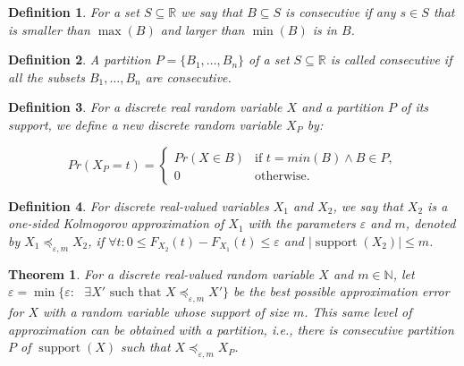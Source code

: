 \documentclass[review]{elsarticle}
\newtheorem{definition}{Definition}
\newtheorem{theorem}{Theorem}
\DeclareMathOperator{\supp}{support}
\DeclareMathOperator{\support}{support}
\begin{document}
\begin{definition}\label{consecutive} For a set $S \subseteq \mathbb{R}$ we say that
$B \subseteq S$ is \emph{consecutive} if any $s\in S$ that is smaller than $\max(B)$ and larger than $\min(B)$ is in $B$.
\end{definition}

\begin{definition}\label{part_consecutive} A partition $P=\{B_1,\dots,B_n\}$ of a set $S \subseteq \mathbb{R}$ is called 
\emph{consecutive} if all the subsets $B_1 ,\dots,B_n$ are consecutive.
\end{definition}


\begin{definition}\label{partition}
	For a discrete real random variable $X$ and a partition $P$ of its support, we define a new discrete random variable $X_P$ by:
	
	$$Pr(X_P = t) = \begin{cases} 
	Pr(X\in B) &  \text{if } t = min(B) \wedge  B \in P, \\
	0      & \text{otherwise.}
	\end{cases}$$
\end{definition}


\begin{definition}
	For discrete real-valued variables $X_1$ and $X_2$, we say that $X_2$ is a one-sided Kolmogorov approximation of $X_1$ with the parameters $\varepsilon$ and $m$, denoted by 
	$X_1 \preceq_{\varepsilon,m} X_2$, if $\forall t\colon 0 \leq   F_{X_2}(t)-F_{X_1}(t) \leq \varepsilon$ and $|\support(X_2)| \leq m$. 
\end{definition}

\begin{theorem}\label{approxAsPart}
	For a discrete real-valued random variable $X$ and $m \in \mathbb{N}$, 
	let $\varepsilon = \min\{\varepsilon \colon \text{  $\exists X'$ such that $X \preceq_{\varepsilon,m} X'$}\}$ be the best possible approximation error for $X$ with a random variable whose support of size $m$. This same level of approximation can be obtained with a partition, i.e., there is consecutive partition $P$ of $\supp(X)$ such that $X \preceq_{\varepsilon,m} X_P$.
	
\end{theorem}
\end{document}
